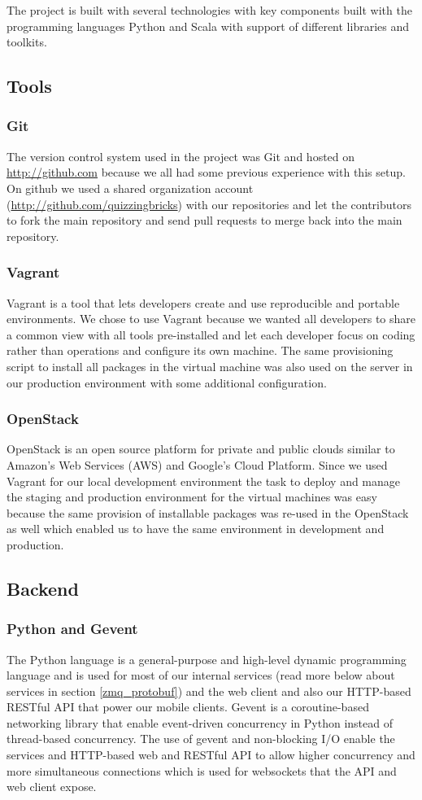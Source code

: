 The project is built with several technologies with key components built with the programming languages Python and Scala with support of different libraries and toolkits.

\subsection{Tools}
\subsubsection{Git}
The version control system used in the project was Git\cite{ref_git} and hosted on \url{http://github.com} because we all had some previous experience with this setup. On github we used a shared organization account (\url{http://github.com/quizzingbricks}) with our repositories and let the contributors to fork the main repository and send pull requests to merge back into the main repository.
\subsubsection{Vagrant}
Vagrant\cite{ref_vagrant} is a tool that lets developers create and use reproducible and portable environments. We chose to use Vagrant because we wanted all developers to share a common view with all tools pre-installed and let each developer focus on coding rather than operations and configure its own machine. The same provisioning script to install all packages in the virtual machine was also used on the server in our production environment with some additional configuration. 
\subsubsection{OpenStack}
OpenStack\cite{ref_openstack} is an open source platform for private and public clouds similar to Amazon's Web Services (AWS) and Google's Cloud Platform. Since we used Vagrant for our local development environment the task to deploy and manage the staging and production environment for the virtual machines was easy because the same provision of installable packages was re-used in the OpenStack as well which enabled us to have the same environment in development and production.

\subsection{Backend}
\subsubsection{Python and Gevent}
The Python language\cite{ref_python} is a general-purpose and high-level dynamic programming language and is used for most of our internal services (read more below about services in section \ref{zmq_protobuf}) and the web client and also our HTTP-based RESTful API that power our mobile clients. Gevent\cite{ref_gevent} is a coroutine-based networking library that enable event-driven concurrency in Python instead of thread-based concurrency. The use of gevent and non-blocking I/O enable the services and HTTP-based web and RESTful API to allow higher concurrency and more simultaneous connections which is used for websockets that the API and web client expose.
